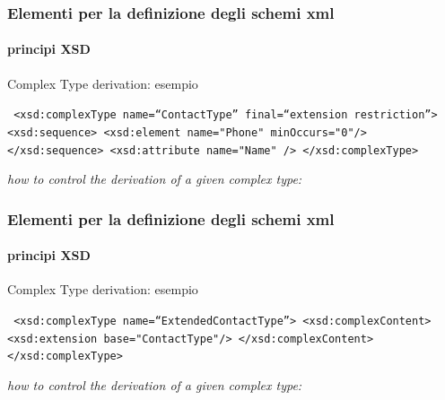 \begin{frame}
	\frametitle{Elementi per la definizione degli schemi xml}
	\framesubtitle{principi XSD}
	\addtocounter{nframe}{1}

	\begin{block}{Complex Type derivation: esempio}

		\texttt{
			<xsd:complexType name=``ContactType'' final=``extension restriction''>
			<xsd:sequence>
			<xsd:element name="Phone" minOccurs="0"/>
			</xsd:sequence>
			<xsd:attribute name="Name" />
			</xsd:complexType>
		}
	\end{block}
	\textit{how to control the derivation of a given complex type: }
\end{frame}

\begin{frame}
	\frametitle{Elementi per la definizione degli schemi xml}
	\framesubtitle{principi XSD}
	\addtocounter{nframe}{1}

	\begin{block}{Complex Type derivation: esempio}

		\texttt{
			<xsd:complexType name=``ExtendedContactType''>
		    <xsd:complexContent>
		      <xsd:extension base="ContactType"/>
		    </xsd:complexContent>
		  </xsd:complexType>
		}
	\end{block}
	\textit{how to control the derivation of a given complex type: }
\end{frame}

